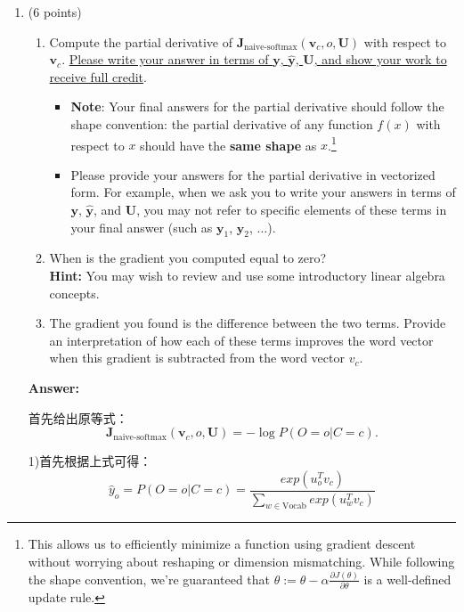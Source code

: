 \documentclass{article}
\newenvironment{answer}{
    {\bf Answer:} \sf \begingroup \color{red}%
}{\par\endgroup}%
\begin{document}
\begin{enumerate}[label=(\alph*)]
\item (6 points)
\begin{enumerate}[label=(\roman*)]
    \item 
    Compute the partial derivative of $\bm J_{\text{naive-softmax}}(\bm v_c, o, \bm U)$ with respect to $\bm v_c$. \ul{Please write your answer in terms of $\bm y$, $\hat{\bm y}$, $\bm U$, and show your work to receive full credit}.
    \begin{itemize} 
        \item \textbf{Note}: Your final answers for the partial derivative should follow the shape convention: the partial derivative of any function $f(x)$ with respect to $x$ should have the \textbf{same shape} as $x$.\footnote{This allows us to efficiently minimize a function using gradient descent without worrying about reshaping or dimension mismatching. While following the shape convention, we're guaranteed that $\theta:= \theta - \alpha\frac{\partial J(\theta)}{\partial \theta}$ is a well-defined update rule.}
        \item Please provide your answers for the partial derivative in vectorized form. For example, when we ask you to write your answers in terms of $\bm y$, $\hat{\bm y}$, and $\bm U$, you may not refer to specific elements of these terms in your final answer (such as $\bm y_1$, $\bm y_2$, $\dots$). 
    \end{itemize}
    \item
    When is the gradient you computed equal to zero? \\
    \textbf{Hint:} You may wish to review and use some introductory linear algebra concepts.
    \item
    The gradient you found is the difference between the two terms. Provide an interpretation of how each of these terms improves the word vector when this gradient is subtracted from the word vector $v_c$.

\end{enumerate}

\begin{shaded}
\begin{answer}
首先给出原等式：
\begin{equation}
	\bm J_{\text{naive-softmax}}(\bm v_c, o, \bm U) = -\log P(O=o| C=c).
\label{naive-softmax}
\end{equation}

1)首先根据上式可得：
\begin{equation}
	 \hat{y}_o = P(O=o|C=c)=\frac{exp(u_o^T v_c)}{\sum_{w\in \text{Vocab}} exp(u_w^T v_c)}
\end{equation}


\end{answer}
\end{shaded}
\end{enumerate}
\end{document}
